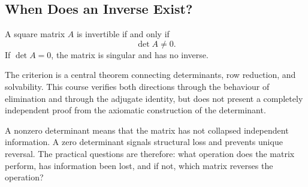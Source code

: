 \subsection{When Does an Inverse Exist?}

\begin{theorembox}
A square matrix $A$ is invertible if and only if
\[
\boxed{\det A\neq0}.
\]
If $\det A=0$, the matrix is singular and has no inverse.
\end{theorembox}

\begin{remarkbox}
The criterion is a central theorem connecting determinants, row reduction, and solvability. This course verifies both directions through the behaviour of elimination and through the adjugate identity, but does not present a completely independent proof from the axiomatic construction of the determinant.
\end{remarkbox}

A nonzero determinant means that the matrix has not collapsed independent information. A zero determinant signals structural loss and prevents unique reversal. The practical questions are therefore: what operation does the matrix perform, has information been lost, and if not, which matrix reverses the operation?
